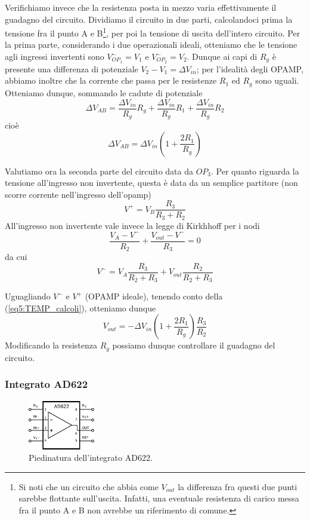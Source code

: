 Verifichiamo invece che la resistenza posta in mezzo varia effettivamente il guadagno del circuito. Dividiamo il circuito in due parti, calcolandoci prima la tensione fra il punto A e B\footnote{Si noti che un circuito che abbia come $V_{out}$ la differenza fra questi due punti sarebbe flottante sull'uscita. Infatti, una eventuale resistenza di carico messa fra il punto A e B non avrebbe un riferimento di comune.}, per poi la tensione di uscita dell'intero circuito. Per la prima parte, considerando i due operazionali ideali, otteniamo che le tensione agli ingressi invertenti sono $V_{OP_1}^- = V_1$ e $V_{OP_2}^- = V_2$. Dunque ai capi di $R_g$ è presente una differenza di potenziale $V_2-V_1 = \Delta V_{in}$; per l'idealità degli OPAMP, abbiamo inoltre che la corrente che passa per le resistenze $R_1$ ed $R_g$ sono uguali. Otteniamo dunque, sommando le cadute di potenziale
$$\Delta V_{AB} = \frac{\Delta V_{in}}{R_g} R_g + \frac{\Delta V_{in}}{R_g} R_1 + \frac{\Delta V_{in}}{R_g} R_2$$
cioè
\begin{equation}
\Delta V_{AB} = \Delta V_{in} \left(1+\frac{2R_1}{R_g}\right)
\label{eq5:TEMP_calcoli}
\end{equation}

Valutiamo ora la seconda parte del circuito data da $OP_3$. Per quanto riguarda la tensione all'ingresso non invertente, questa è data da un semplice partitore (non scorre corrente nell'ingresso dell'opamp)
$$V^+=V_B \frac{R_3}{R_3+R_2}$$
All'ingresso non invertente vale invece la legge di Kirkhhoff per i nodi
$$\frac{V_A-V^-}{R_2}+\frac{V_{out}-V^-}{R_3}=0$$
da cui
$$V^-=V_A \frac{R_3}{R_2+R_3} + V_{out} \frac{R_2}{R_2+R_3}$$

Uguagliando $V^-$ e $V^+$ (OPAMP ideale), tenendo conto della (\ref{eq5:TEMP_calcoli}), otteniamo dunque
$$V_{out}=-\Delta V_{in} \left(1+\frac{2R_1}{R_g}\right)\frac{R_3}{R_2}$$
Modificando la resistenza $R_g$ possiamo dunque controllare il guadagno del circuito.

\subsubsection{Integrato AD622}

\begin{figure}
  \begin{center}
    \includegraphics[width=0.260\textwidth]{../E05/latex/AD622.pdf}
  \end{center}
  \caption{Piedinatura dell'integrato AD622.}
  \label{cir5:ad622_piedinatura}
\end{figure}

